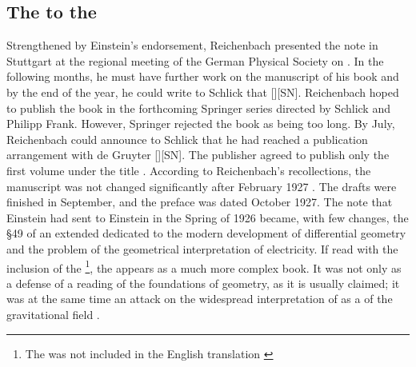\documentclass[final]{article}
\newcommand{\PRZL}{\citetitle{Reichenbach1928}\xspace}
\newcommand{\Reich}{Reichenbach\xspace}
\begin{document}
\subsection{The \Ap to the \PRZL}

Strengthened by Einstein's endorsement, Reichenbach presented the note in Stuttgart at the regional meeting of the German Physical Society on  \citep{Reichenbach1926d}. In the following months, he must have further work on the manuscript of his book and by the end of the year, he could write to Schlick that  [][SN]\label{RZL1926}. Reichenbach hoped to publish the book in the forthcoming Springer series  directed by Schlick and Philipp Frank. However, Springer rejected the book as being too long. By July, Reichenbach could announce to Schlick that he had reached a publication arrangement with de Gruyter [][SN]. The publisher agreed to publish only the first volume under the title . According to \Reich's recollections, the manuscript was not changed significantly after February 1927 \citep[044-06-25]{HR}. The drafts were finished in September, and the preface was dated October 1927. The note that Einstein had sent to Einstein in the Spring of 1926 became, with few changes, the \S49 of an extended \Ap dedicated to the modern development of differential geometry and the problem of the geometrical interpretation of electricity. If read with the inclusion of the \Ap\footnote{The \Ap was not included in the English translation \cite{Reichenbach1958}}, the \PRZL appears as a much more complex book. It was not only as a defense of a  reading of the foundations of geometry, as it is usually claimed; it was at the same time an attack on the widespread interpretation of \gr as a  of the gravitational field .
\end{document}
